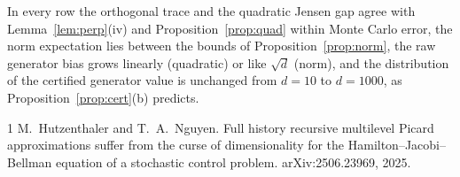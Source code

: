 \documentclass[11pt]{article}
\theoremstyle{remark}
\theoremstyle{definition}
\begin{document}


In every row the orthogonal trace and the quadratic Jensen gap agree with
Lemma~\ref{lem:perp}(iv) and Proposition~\ref{prop:quad} within Monte Carlo error, the
norm expectation lies between the bounds of Proposition~\ref{prop:norm}, the raw
generator bias grows linearly (quadratic) or like $\sqrt d$ (norm), and the
distribution of the certified generator value is unchanged from $d=10$ to $d=1000$, as
Proposition~\ref{prop:cert}(b) predicts.

\begin{thebibliography}{1}
M.~Hutzenthaler and T.~A.~Nguyen.
\newblock Full history recursive multilevel Picard approximations suffer from the curse
of dimensionality for the Hamilton--Jacobi--Bellman equation of a stochastic control
problem.
\newblock arXiv:2506.23969, 2025.
\end{thebibliography}
\end{document}
